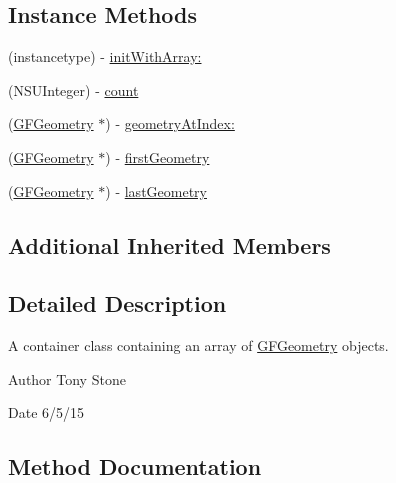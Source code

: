 \subsection*{Instance Methods}
\begin{DoxyCompactItemize}
\item 
(instancetype) -\/ \hyperlink{interface_g_f_geometry_collection_a260bb3daa9d3324cb1cc2fa9ef3a61e9}{init\+With\+Array\+:}
\item 
(N\+S\+U\+Integer) -\/ \hyperlink{interface_g_f_geometry_collection_a020dd5245b572a391ccbd1ea92699240}{count}
\item 
(\hyperlink{interface_g_f_geometry}{G\+F\+Geometry} $\ast$) -\/ \hyperlink{interface_g_f_geometry_collection_aa4a654ef8751bdf8abac169f8746d026}{geometry\+At\+Index\+:}
\item 
(\hyperlink{interface_g_f_geometry}{G\+F\+Geometry} $\ast$) -\/ \hyperlink{interface_g_f_geometry_collection_a1910e3af2895a6c9cb7baf18ec791aad}{first\+Geometry}
\item 
(\hyperlink{interface_g_f_geometry}{G\+F\+Geometry} $\ast$) -\/ \hyperlink{interface_g_f_geometry_collection_a46262687af8b3c6599b2b2d68b0481b6}{last\+Geometry}
\end{DoxyCompactItemize}
\subsection*{Additional Inherited Members}


\subsection{Detailed Description}
A container class containing an array of \hyperlink{interface_g_f_geometry}{G\+F\+Geometry} objects. 

\begin{DoxyAuthor}{Author}
Tony Stone 
\end{DoxyAuthor}
\begin{DoxyDate}{Date}
6/5/15 
\end{DoxyDate}


\subsection{Method Documentation}
\hypertarget{interface_g_f_geometry_collection_a260bb3daa9d3324cb1cc2fa9ef3a61e9}{}
